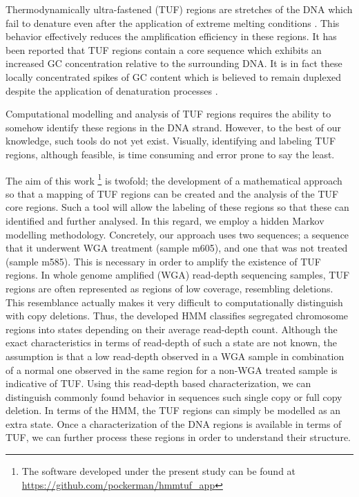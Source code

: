 \documentclass[12pt]{article}
\begin{document}
Thermodynamically ultra-fastened (TUF) regions are stretches of the DNA which fail to denature
even after the application of extreme melting conditions \cite{veal2012}. 
This behavior effectively reduces the amplification efficiency in these regions. It has been reported that TUF regions contain a core sequence which exhibits an increased GC concentration relative to the surrounding DNA. It is in fact these locally concentrated spikes of GC content which is believed to remain duplexed despite the application of denaturation processes \cite{veal2012}. 

Computational modelling and analysis of TUF regions requires the ability to somehow identify these regions in the 
DNA strand. However, to the best of our knowledge, such tools do not yet exist. Visually, identifying and
labeling TUF regions, although feasible, is time consuming and error prone to say the least. 

The aim of this work \footnote{The software developed under the present study can be found at \url{https://github.com/pockerman/hmmtuf_app}} is twofold; the development of a mathematical approach so that a mapping of TUF regions can be created and the analysis of the TUF core regions. Such a tool will allow the labeling of these regions so that these can identified and further analysed.  In this regard, we employ a hidden Markov modelling methodology. Concretely, our approach uses two sequences; a sequence that it underwent WGA treatment (sample  m605), and  one that was not treated (sample m585). This is necessary in order to amplify the existence of TUF regions. In whole genome amplified (WGA) read-depth sequencing samples, TUF regions are often represented as regions of low coverage, resembling deletions. This resemblance actually makes it very difficult to computationally distinguish with copy deletions.
Thus,  the developed HMM classifies segregated chromosome regions into states depending on their average read-depth count. 
Although the exact characteristics in terms of read-depth of such a state are not known, the assumption is that a low read-depth observed in a WGA sample in combination 
of a normal one observed in the same region for a non-WGA treated sample is indicative of TUF. Using this read-depth based characterization, we can distinguish commonly found behavior in sequences such single copy or full copy deletion. In terms of the HMM, the TUF regions can simply be modelled as an extra state. Once a characterization of the DNA regions is available in terms of TUF, we can further process these regions in order to understand their structure. 
\end{document}
